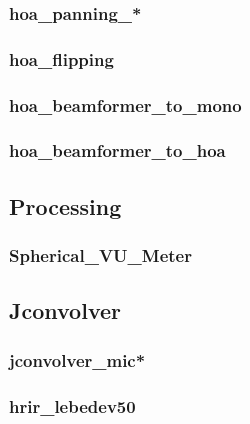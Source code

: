 \documentclass[10pt,a4paper]{article}
\begin{document}
\label{sec:hoa_decoder}
\subsubsection{hoa\_panning\_*}
\subsubsection{hoa\_flipping}
\subsubsection{hoa\_beamformer\_to\_mono}
\subsubsection{hoa\_beamformer\_to\_hoa}
\subsection{Processing}
\subsubsection{Spherical\_VU\_Meter}
\subsection{Jconvolver}
\subsubsection{jconvolver\_mic*}
\subsubsection{hrir\_lebedev50}


\end{document}

